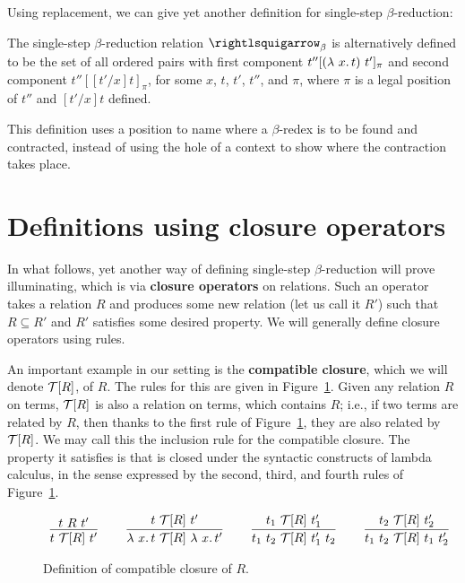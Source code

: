 Using replacement, we can give yet another definition for single-step $\beta$-reduction:

\begin{definition}
\label{def:betapos}
The single-step $\beta$-reduction relation
$\curva_\beta$ is alternatively defined to be the set of all ordered pairs with first component $t''[(\lambda\ x.\, t)\ t']_\pi$
and second component $t''[[t'/x]t]_\pi$, for some $x$, $t$, $t'$, $t''$, and $\pi$, where $\pi$ is a legal position of $t''$
and $[t'/x]t$ defined.
\end{definition}

This definition uses a position to name where a $\beta$-redex is to be found and contracted, instead of using the hole of a context
to show where the contraction takes place.

\section{Definitions using closure operators}
\label{sec:clos}

In what follows, yet another way of defining single-step
$\beta$-reduction will prove illuminating, which is via
\textbf{closure operators} on relations.
Such an operator takes a relation $R$ and produces some new relation (let us
call it $R'$) such that $R\subseteq R'$ and $R'$ satisfies some desired property.
We will generally define closure operators using rules.

An important example in our setting is the \textbf{compatible closure},
which we will denote
$\mathcal{T}[R]$, of $R$.  The rules for this are
given in Figure~\ref{fig:compcl}.  Given any relation $R$ on terms,
$\mathcal{T}[R]$ is also a relation on terms, which contains $R$; i.e., if
two terms are related by $R$, then thanks to the first rule of
Figure~\ref{fig:compcl}, they are also related by $\mathcal{T}[R]$.  We may
call this the inclusion rule for the compatible closure. 
The property it satisfies is that is closed under the syntactic constructs
of lambda calculus, in the sense expressed by the second, third, and
fourth rules of Figure~\ref{fig:compcl}.


\begin{figure}
  \[
  \begin{array}{lllllll}
\infer{t\ \Tau[R]\ t'}{t\ R\ t' } & \ &
\infer{\lam{x}{t}\ \Tau[R]\ \lam{x}{t'}}{t\ \Tau[R]\ t'} & \ &
\infer{t_1\ t_2\ \Tau[R]\ t_1'\ t_2}{t_1\ \Tau[R]\ t_1'} &\ &
\infer{t_1\ t_2\ \Tau[R]\ t_1\ t_2'}{t_2\ \Tau[R]\ t_2'}
  \end{array}
  \]
  \caption{Definition of compatible closure of $R$.}
  \label{fig:compcl}
\end{figure}

